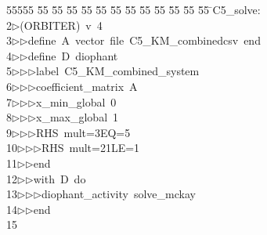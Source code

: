 %
%
\begin{tabbing}
55555 \= 55 \= 55 \= 55 \= 55 \= 55 \= 55 \= 55 \= 55 \= 55 \= 55 \= 55 \= 55 \= \>C5\_solve:\\[0pt]
2\>$\triangleright$\>(ORBITER)\ v\ 4\ \\[0pt]
3\>$\triangleright$\>$\triangleright$\>define\ A\ vector\ file\ C5\_KM\_combinedcsv\ end\ \\[0pt]
4\>$\triangleright$\>$\triangleright$\>define\ D\ diophant\ \\[0pt]
5\>$\triangleright$\>$\triangleright$\>$\triangleright$\>label\ C5\_KM\_combined\_system\ \\[0pt]
6\>$\triangleright$\>$\triangleright$\>$\triangleright$\>coefficient\_matrix\ A\ \\[0pt]
7\>$\triangleright$\>$\triangleright$\>$\triangleright$\>x\_min\_global\ 0\ \\[0pt]
8\>$\triangleright$\>$\triangleright$\>$\triangleright$\>x\_max\_global\ 1\ \\[0pt]
9\>$\triangleright$\>$\triangleright$\>$\triangleright$\>RHS\ mult=3EQ=5\ \\[0pt]
10\>$\triangleright$\>$\triangleright$\>$\triangleright$\>RHS\ mult=21LE=1\ \\[0pt]
11\>$\triangleright$\>$\triangleright$\>end\ \\[0pt]
12\>$\triangleright$\>$\triangleright$\>with\ D\ do\ \\[0pt]
13\>$\triangleright$\>$\triangleright$\>$\triangleright$\>diophant\_activity\ solve\_mckay\ \\[0pt]
14\>$\triangleright$\>$\triangleright$\>end\\[0pt]
15\>\end{tabbing}
